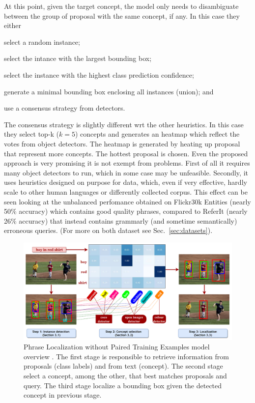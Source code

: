 At this point, given the target concept, the model only needs to
disambiguate between the group of proposal with the same concept, if
any. In this case they either
\begin{enumerate*}[label=(\roman*)] 
  \item select a random instance;
  \item select the intance with the largest bounding box; 
  \item select the instance with the highest class prediction
  confidence;
  \item generate a minimal bounding box enclosing all instances
  (union); and
  \item use a consensus strategy from detectors.
\end{enumerate*} 
The consensus strategy is slightly different wrt the other heuristics.
In this case they select top-k ($k = 5$) concepts and generates an
heatmap which reflect the votes from object detectors. The heatmap is
generated by heating up proposal that represent more concepts. The
hottest proposal is chosen. Even the proposed approach is very
promising it is not exempt from problems. First of all it requires
many object detectors to run, which in some case may be unfeasible.
Secondly, it uses heuristics designed on purpose for data, which, even
if very effective, hardly scale to other human languages or
differently collected corpus. This effect can be seen looking at the
unbalanced perfomance obtained on Flickr30k Entities (nearly 50\%
accuracy) which contains good quality phrases, compared to ReferIt
(nearly 26\% accuracy) that instead contains grammarly (and sometime
semantically) erroneous queries. (For more on both dataset see
Sec.~\ref{sec:datasets}). 

\begin{figure}
  \centering
  \includegraphics[width=.8\textwidth]{figures/phraseloc-model.png}
  \caption[Phrase Localization without Paired Training Examples model
  overview]{Phrase Localization without Paired Training Examples model
  overview \cite{wang2019phrase}. The first stage is responsible to
  retrieve information from proposals (class labels) and from text
  (concept). The second stage select a concept, among the other, that
  best matches proposals and query. The third stage localize a
  bounding box given the detected concept in previous stage.}
  \label{fig:phraseloc-model}
\end{figure}

